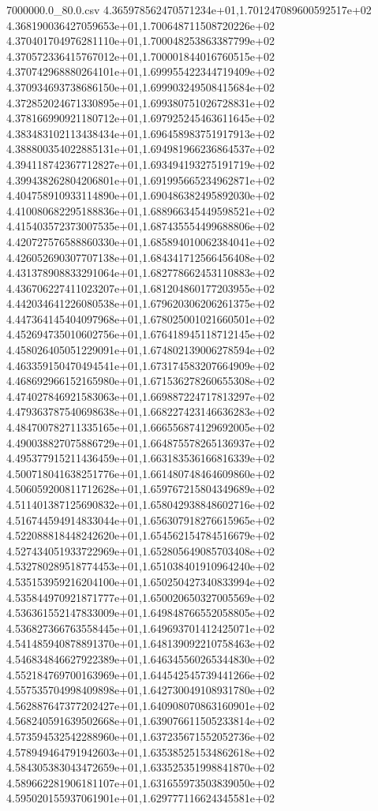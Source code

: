 \begin{filecontents*}{7000000.0_80.0.csv}
4.365978562470571234e+01,1.701247089600592517e+02
4.368190036427059653e+01,1.700648711508720226e+02
4.370401704976281110e+01,1.700048253863387799e+02
4.370572336415767012e+01,1.700001844016760515e+02
4.370742968880264101e+01,1.699955422344719409e+02
4.370934693738686150e+01,1.699903249508415684e+02
4.372852024671330895e+01,1.699380751026728831e+02
4.378166990921180712e+01,1.697925245463611645e+02
4.383483102113438434e+01,1.696458983751917913e+02
4.388800354022885131e+01,1.694981966236864537e+02
4.394118742367712827e+01,1.693494193275191719e+02
4.399438262804206801e+01,1.691995665234962871e+02
4.404758910933114890e+01,1.690486382495892030e+02
4.410080682295188836e+01,1.688966345449598521e+02
4.415403572373007535e+01,1.687435554499688806e+02
4.420727576588860330e+01,1.685894010062384041e+02
4.426052690307707138e+01,1.684341712566456408e+02
4.431378908833291064e+01,1.682778662453110883e+02
4.436706227411023207e+01,1.681204860177203955e+02
4.442034641226080538e+01,1.679620306206261375e+02
4.447364145404097968e+01,1.678025001021660501e+02
4.452694735010602756e+01,1.676418945118712145e+02
4.458026405051229091e+01,1.674802139006278594e+02
4.463359150470494541e+01,1.673174583207664909e+02
4.468692966152165980e+01,1.671536278260655308e+02
4.474027846921583063e+01,1.669887224717813297e+02
4.479363787540698638e+01,1.668227423146636283e+02
4.484700782711335165e+01,1.666556874129692005e+02
4.490038827075886729e+01,1.664875578265136937e+02
4.495377915211436459e+01,1.663183536166816339e+02
4.500718041638251776e+01,1.661480748464609860e+02
4.506059200811712628e+01,1.659767215804349689e+02
4.511401387125690832e+01,1.658042938848602716e+02
4.516744594914833044e+01,1.656307918276615965e+02
4.522088818448242620e+01,1.654562154784516679e+02
4.527434051933722969e+01,1.652805649085703408e+02
4.532780289518774453e+01,1.651038401910964240e+02
4.535153959216204100e+01,1.650250427340833994e+02
4.535844970921871777e+01,1.650020650327005569e+02
4.536361552147833009e+01,1.649848766552058805e+02
4.536827366763558445e+01,1.649693701412425071e+02
4.541485940878891370e+01,1.648139092210758463e+02
4.546834846627922389e+01,1.646345560265344830e+02
4.552184769700163969e+01,1.644542545739441266e+02
4.557535704998409898e+01,1.642730049108931780e+02
4.562887647377202427e+01,1.640908070863160901e+02
4.568240591639502668e+01,1.639076611505233814e+02
4.573594532542288960e+01,1.637235671552052736e+02
4.578949464791942603e+01,1.635385251534862618e+02
4.584305383043472659e+01,1.633525351998841870e+02
4.589662281906181107e+01,1.631655973503839050e+02
4.595020155937061901e+01,1.629777116624345581e+02

\end{filecontents*}
